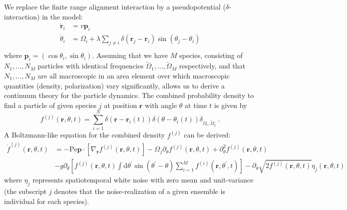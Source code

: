 \documentclass{article}
\begin{document}
We replace the finite range alignment interaction by a pseudopotential ($\delta$-interaction) in the model:
\begin{equation}
    \label{eq:ourModel}
    \begin{aligned}
        \dot{\mathbf{r}}_i&=v\mathbf{p}_i\\
        \dot{\theta}_i&=\Omega _i+\lambda \sum_{j\ne i}{\delta}\left( \mathbf{r}_j-\mathbf{r}_i \right) \sin \left( \theta _j-\theta _i \right)\\
    \end{aligned}
\end{equation}
where $\mathbf{p}_i=(\cos\theta_i, \sin\theta_i)$. 
Assuming that we have $M$ species, consisting of $N_1, \dots, N_M$ particles with identical frequencies $\tilde{\Omega}_1, \dots, \tilde{\Omega}_M$ respectively, and that $N_1, \dots, N_M$ are all macroscopic in an area element over which macroscopic quantities (density, polarization) vary significantly, allows us to derive a continuum theory for the particle dynamics.
The combined probability density to find a particle of given species $j$ at position $\mathbf{r}$ with angle $\theta$ at time $t$ is given by
\begin{equation}
    \label{eq:combinedDensity}
    f^{\left( j \right)}\left( \mathbf{r},\theta ,t \right) =\sum_{i=1}^N{\delta \left( \mathbf{r}-\mathbf{r}_i\left( t \right) \right) \delta \left( \theta -\theta _i\left( t \right) \right) \delta _{\Omega _i,\tilde{\Omega}_j}}\;.
\end{equation}
A Boltzmann-like equation for the combined density $f^{\left( j \right)}$ can be derived:
\begin{equation}
    \label{eq:combinedDensityDynamics}
    \begin{aligned}
        \dot{f}^{(j)}(\mathbf{r},\theta,t)& = -\mathrm{Pe} \mathbf{p}\cdot\left[\nabla_\mathbf{r}f^{(j)}(\mathbf{r},\theta,t)\right]-\Omega_j\partial_\theta f^{(j)}(\mathbf{r},\theta,t)+\partial_\theta^2f^{(j)}(\mathbf{r},\theta,t) 
        \\
        &- g\partial_\theta\left[f^{(j)}(\mathbf{r},\theta,t)\int\mathrm{d}\theta^{\prime}\sin(\theta^{\prime}-\theta)\sum_{i=1}^Mf^{(i)}(\mathbf{r},\theta^{\prime},t)\right]-\partial_\theta\sqrt{2f^{(j)}(\mathbf{r},\theta,t)}\eta_j(\mathbf{r},\theta,t)
    \end{aligned}
\end{equation}
where $\eta_j$ represents spatiotemporal white noise with zero mean and unit-variance (the subscript $j$ denotes that the noise-realization of a given ensemble is individual for each species).
\end{document}

